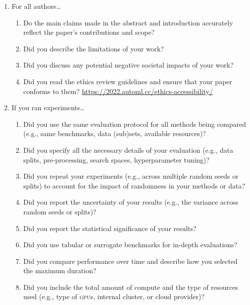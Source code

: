 \documentclass[11pt]{article}
\begin{document}
\begin{enumerate}
\item For all authors\dots
  \begin{enumerate}
  \item Do the main claims made in the abstract and introduction accurately
    reflect the paper's contributions and scope?
    \answerYes{}
  \item Did you describe the limitations of your work?
  \item Did you discuss any potential negative societal impacts of your work?
  \item Did you read the ethics review guidelines and ensure that your paper
    conforms to them? \url{https://2022.automl.cc/ethics-accessibility/}
    \answerYes{}
  \end{enumerate}
\item If you ran experiments\dots
  \begin{enumerate}
  \item Did you use the same evaluation protocol for all methods being compared (e.g.,
    same benchmarks, data (sub)sets, available resources)?
    \answerNA{}
  \item Did you specify all the necessary details of your evaluation (e.g., data splits,
    pre-processing, search spaces, hyperparameter tuning)?
    \answerNA{}
  \item Did you repeat your experiments (e.g., across multiple random seeds or splits) to account for the impact of randomness in your methods or data?
    \answerNA{}
  \item Did you report the uncertainty of your results (e.g., the variance across random seeds or splits)?
    \answerNA{}
  \item Did you report the statistical significance of your results?
    \answerNA{}
  \item Did you use tabular or surrogate benchmarks for in-depth evaluations?
    \answerNA{}
  \item Did you compare performance over time and describe how you selected the maximum duration?
    \answerNA{}
  \item Did you include the total amount of compute and the type of resources
    used (e.g., type of \textsc{gpu}s, internal cluster, or cloud provider)?

\end{enumerate}
\end{enumerate}
\end{document}
